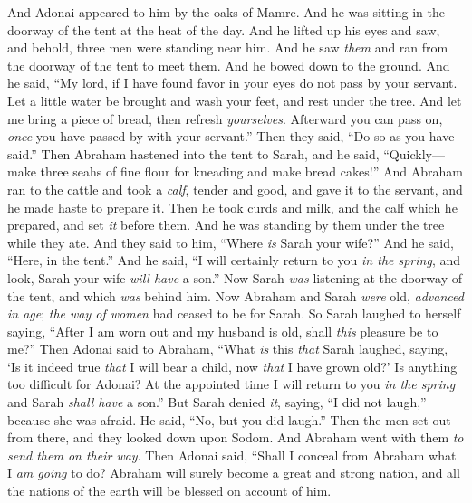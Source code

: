 \begin{biblechapter} %
 And Adonai appeared to him by the oaks of Mamre. And he was sitting in the doorway of the tent at the heat of the day.
\verse And he lifted up his eyes and saw, and behold, three men were standing near him. And he saw \textit{them} and ran from the doorway of the tent to meet them. And he bowed down to the ground.
\verse And he said, “My lord, if I have found favor in your eyes do not pass by your servant.
\verse Let a little water be brought and wash your feet, and rest under the tree.
\verse And let me bring a piece of bread, then refresh \textit{yourselves}. Afterward you can pass on, \textit{once} you have passed by with your servant.” Then they said, “Do so as you have said.”
\verse Then Abraham hastened into the tent to Sarah, and he said, “Quickly—make three seahs of fine flour for kneading and make bread cakes!”
\verse And Abraham ran to the cattle and took a \textit{calf}, tender and good, and gave it to the servant, and he made haste to prepare it.
\verse Then he took curds and milk, and the calf which he prepared, and set \textit{it} before them. And he was standing by them under the tree while they ate.
\verse And they said to him, “Where \textit{is} Sarah your wife?” And he said, “Here, in the tent.”
\verse And he said, “I will certainly return to you \textit{in the spring}, and look, Sarah your wife \textit{will have} a son.” Now Sarah \textit{was} listening at the doorway of the tent, and which \textit{was} behind him.
\verse Now Abraham and Sarah \textit{were} old, \textit{advanced in age}; \textit{the way of women} had ceased to be for Sarah.
\verse So Sarah laughed to herself saying, “After I am worn out and my husband is old, shall \textit{this} pleasure be to me?”
\verse Then Adonai said to Abraham, “What \textit{is} this \textit{that} Sarah laughed, saying, ‘Is it indeed true \textit{that} I will bear a child, now \textit{that} I have grown old?’
\verse Is anything too difficult for Adonai? At the appointed time I will return to you \textit{in the spring} and Sarah \textit{shall have} a son.”
\verse But Sarah denied \textit{it}, saying, “I did not laugh,” because she was afraid. He said, “No, but you did laugh.”
\verse Then the men set out from there, and they looked down upon Sodom. And Abraham went with them \textit{to send them on their way}.
\verse Then Adonai said, “Shall I conceal from Abraham what I \textit{am going} to do?
\verse Abraham will surely become a great and strong nation, and all the nations of the earth will be blessed on account of him.

\end{biblechapter}
